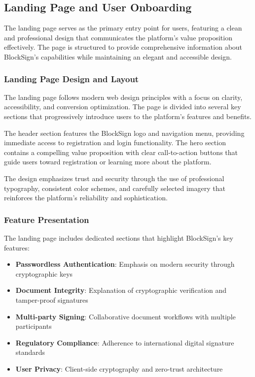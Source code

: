 \subsection{Landing Page and User Onboarding}
The landing page serves as the primary entry point for users, featuring a clean and professional design that communicates the platform's value proposition effectively. The page is structured to provide comprehensive information about BlockSign's capabilities while maintaining an elegant and accessible design.

\subsubsection{Landing Page Design and Layout}
The landing page follows modern web design principles with a focus on clarity, accessibility, and conversion optimization. The page is divided into several key sections that progressively introduce users to the platform's features and benefits.

The header section features the BlockSign logo and navigation menu, providing immediate access to registration and login functionality. The hero section contains a compelling value proposition with clear call-to-action buttons that guide users toward registration or learning more about the platform.

The design emphasizes trust and security through the use of professional typography, consistent color schemes, and carefully selected imagery that reinforces the platform's reliability and sophistication.

\subsubsection{Feature Presentation}
The landing page includes dedicated sections that highlight BlockSign's key features:

\begin{itemize}
    \item \textbf{Passwordless Authentication}: Emphasis on modern security through cryptographic keys
    \item \textbf{Document Integrity}: Explanation of cryptographic verification and tamper-proof signatures
    \item \textbf{Multi-party Signing}: Collaborative document workflows with multiple participants
    \item \textbf{Regulatory Compliance}: Adherence to international digital signature standards
    \item \textbf{User Privacy}: Client-side cryptography and zero-trust architecture
\end{itemize}


